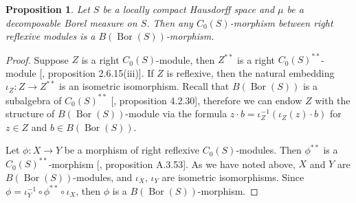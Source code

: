 \documentclass[12pt]{article}
\newtheorem{proposition}[theorem]{Proposition}
\begin{document}
\begin{proposition}\label{C0SMorphBtwnReflxSpIsBMorph}
    Let $S$ be a locally compact Hausdorff space and $\mu$ be a decomposable 
    Borel measure on $S$. Then any $C_0(S)$-morphism between 
    right reflexive modules is a $B(\operatorname{Bor}(S))$-morphism. 
\end{proposition}
\begin{proof} 
    Suppose $Z$ is a right $C_0(S)$-module, then $Z^{**}$ is a 
    right $C_0(S)^{**}$-module 
    [\cite{DalBanAlgAutCont}, proposition 2.6.15(iii)]. If $Z$ is reflexive, 
    then the natural embedding $\iota_Z:Z\to Z^{**}$ is an isometric 
    isomorphism. Recall that $B(\operatorname{Bor}(S))$ is a subalgebra 
    of $C_0(S)^{**}$ [\cite{DalBanAlgAutCont}, proposition 4.2.30], 
    therefore we can endow $Z$ with the structure 
    of $B(\operatorname{Bor}(S))$-module via 
    the formula $z\cdot b=\iota_Z^{-1}(\iota_Z(z)\cdot b)$ for $z\in Z$ 
    and $b\in B(\operatorname{Bor}(S))$.
    
    Let $\phi:X\to Y$ be a morphism of right reflexive $C_0(S)$-modules. 
    Then $\phi^{**}$ is a $C_0(S)^{**}$-morphism
    [\cite{DalBanAlgAutCont}, proposition A.3.53]. As we have noted above, $X$
    and $Y$ are $B(\operatorname{Bor}(S))$-modules, 
    and $\iota_X$, $\iota_Y$ are isometric isomorphisms. 
    Since $\phi=\iota_Y^{-1}\circ \phi^{**}\circ \iota_X$, then $\phi$ is 
    a $B(\operatorname{Bor}(S))$-morphism.
\end{proof}
\end{document}
